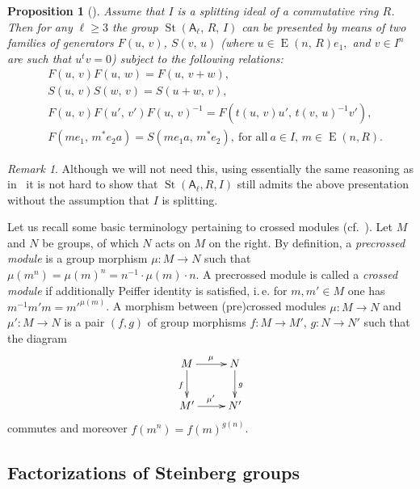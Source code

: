 \documentclass[oneside, 10pt]{amsart}
\DeclareMathOperator{\St}{St}
\DeclareMathOperator{\E}{E}
\newcommand{\rA}{\mathsf{A}}
\numberwithin{equation}{section}
\numberwithin{lemma}{section}
\newtheorem{prop}[lemma]{Proposition}
\theoremstyle{definition}
\theoremstyle{remark}
\newtheorem{rem}[lemma]{Remark}
\begin{document}
\begin{prop}[] \label{prop:rel-presentation}
 Assume that $I$ is a splitting ideal of a commutative ring $R$. 
 Then for any $\ell\geq 3$ the group $\St(\rA_\ell,\,R,\,I)$ can be presented by means of two families of generators $F(u,\,v)$, $S(v,\,u)$
  (where $u\in \E(n,\,R)e_1,$ and $v\in I^n$ are such that $u^tv=0$) subject to the following relations:
\begin{align}
&F(u,\,v)F(u,\,w)=F(u,\,v+w), \label{add4}\\
&S(u,\,v)S(w,\,v)=S(u+w,\,v), \label{add5}\\
&F(u,\,v)F(u',\,v')F(u,\,v)^{-1}=F(t(u,\,v)u',\,t(v,\,u)^{-1} v'), \label{conj3} \\
&F(me_1,\,m^*e_2a)=S(me_1a,\,m^*e_2),\ \text{for all}\ a\in I,\, m \in \E(n, R). \label{coef-move}
\end{align}
\end{prop}
\begin{rem}
Although we will not need this, using essentially the same reasoning as in~\cite[Proposition~8]{S15} it is not hard to show that 
$\St(\rA_\ell, R, I)$ still admits the above presentation without the assumption that $I$ is splitting.
\end{rem}

Let us recall some basic terminology pertaining to crossed modules (cf.~\cite[\S~3.3]{BHS11}). Let $M$ and $N$ be groups, of which $N$ acts on $M$ on the right. By definition, a {\it precrossed module} is a group morphism $\mu \colon M \to N$ such that $\mu(m^n) = \mu(m)^n = n^{-1} \cdot \mu(m) \cdot n$. A precrossed module is called a {\it crossed module} if additionally Peiffer identity is satisfied, i.\,e. for $m, m'\in M$ one has $m^{-1} m' m = {m'}^{\mu(m)}$.
A morphism between (pre)crossed modules $\mu \colon M \to N$ and $\mu'\colon M \to N$ is a pair $(f, g)$ of group morphisms $f\colon M \to M'$, $g \colon N \to N'$ such that the diagram 
\begin{equation} \xymatrix{ M \ar[r]^{\mu} \ar[d]_{f} & N \ar[d]^{g} \\ M' \ar[r]^{\mu'} & N'}\end{equation} commutes and moreover $f(m^n) = f(m)^{g(n)}$.


\subsection{Factorizations of Steinberg groups}
\end{document}
